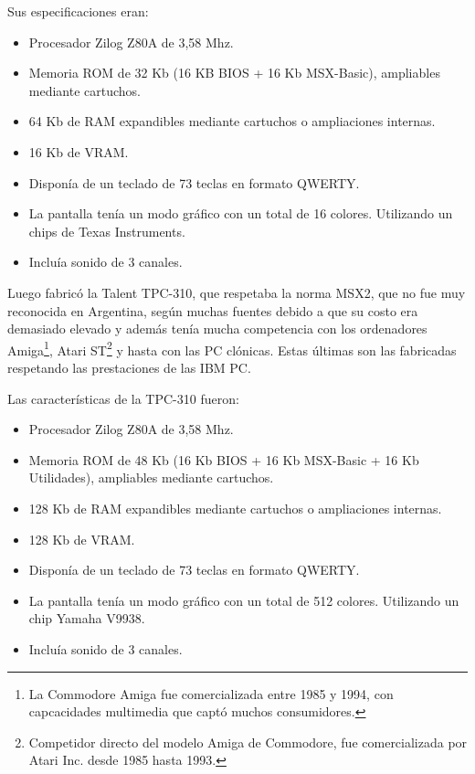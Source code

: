 \documentclass[%
 	final,
%
	notitlepage,
	narroweqnarray,
	inline,
 	twoside,
	]{ieee}
\begin{document}
Sus especificaciones eran:\\

\begin{itemize}
\item Procesador Zilog Z80A de 3,58 Mhz.
\item Memoria ROM de 32 Kb (16 KB BIOS + 16 Kb MSX-Basic), ampliables mediante cartuchos.
\item 64 Kb de RAM expandibles mediante cartuchos o ampliaciones internas.
\item 16 Kb de VRAM.
\item Dispon\'ia de un teclado de 73 teclas en formato QWERTY.
\item La pantalla ten\'ia un modo gr\'afico con un total de 16 colores. Utilizando un chips de Texas Instruments.
\item Inclu\'ia sonido de 3 canales.\\
\end{itemize}

Luego fabric\'o la Talent TPC-310, que respetaba la norma MSX2, que no fue muy reconocida en Argentina, seg\'un muchas fuentes debido a que su costo era demasiado elevado y adem\'as ten\'ia mucha competencia con los ordenadores Amiga\footnote{La Commodore Amiga fue comercializada entre 1985 y 1994, con capcacidades multimedia que capt\'o muchos consumidores\cite{amiga}.}, Atari ST\footnote{Competidor directo del modelo Amiga de Commodore, fue comercializada por Atari Inc. desde 1985 hasta 1993\cite{atari}.} y hasta con las PC cl\'onicas. Estas \'ultimas son las fabricadas respetando las prestaciones de las IBM PC.

Las caracter\'isticas de la TPC-310 fueron:\\

\begin{itemize}
\item Procesador Zilog Z80A de 3,58 Mhz.
\item Memoria ROM de 48 Kb (16 Kb BIOS + 16 Kb MSX-Basic + 16 Kb Utilidades), ampliables mediante cartuchos.
\item 128 Kb de RAM expandibles mediante cartuchos o ampliaciones internas.
\item 128 Kb de VRAM.
\item Dispon\'ia de un teclado de 73 teclas en formato QWERTY.
\item La pantalla ten\'ia un modo gr\'afico con un total de 512 colores. Utilizando un chip Yamaha V9938.
\item Inclu\'ia sonido de 3 canales.
\end{itemize}
\end{document}
